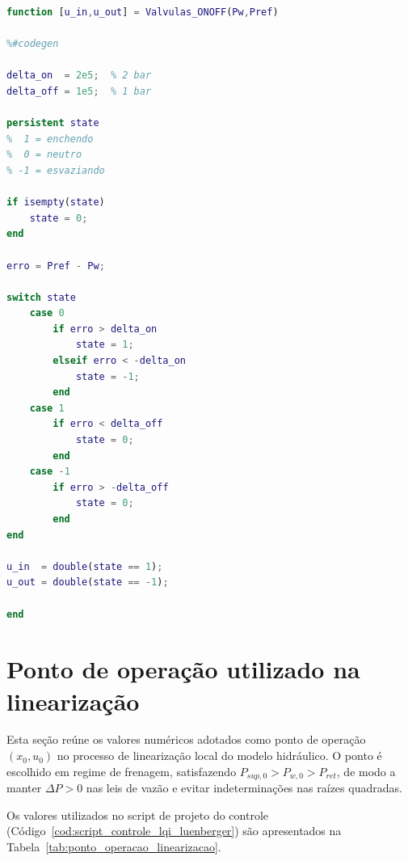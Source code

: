 \begin{lstlisting}[caption={Bloco \texttt{MATLAB Function}: lógica discreta (on/off com histerese) para válvulas de entrada e saída}, label={cod:matlab_function_valvulas_onoff}, language=Matlab]
function [u_in,u_out] = Valvulas_ONOFF(Pw,Pref)

%#codegen

delta_on  = 2e5;  % 2 bar
delta_off = 1e5;  % 1 bar

persistent state
%  1 = enchendo
%  0 = neutro
% -1 = esvaziando

if isempty(state)
    state = 0;
end

erro = Pref - Pw;

switch state
    case 0
        if erro > delta_on
            state = 1;
        elseif erro < -delta_on
            state = -1;
        end
    case 1
        if erro < delta_off
            state = 0;
        end
    case -1
        if erro > -delta_off
            state = 0;
        end
end

u_in  = double(state == 1);
u_out = double(state == -1);

end
\end{lstlisting}

\section{Ponto de operação utilizado na linearização}
\label{ap:ponto-operacao}

Esta seção reúne os valores numéricos adotados como ponto de operação $(x_0,u_0)$ no processo de linearização local do modelo hidráulico. O ponto é escolhido em regime de frenagem, satisfazendo $P_{sup,0}>P_{w,0}>P_{ret}$, de modo a manter $\Delta P>0$ nas leis de vazão e evitar indeterminações nas raízes quadradas.

Os valores utilizados no script de projeto do controle (Código~\ref{cod:script_controle_lqi_luenberger}) são apresentados na Tabela~\ref{tab:ponto_operacao_linearizacao}.

